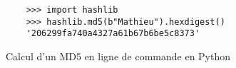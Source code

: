 \begin{figure}
  \begin{verbatim}
    >>> import hashlib
    >>> hashlib.md5(b"Mathieu").hexdigest()
    '206299fa740a4327a61b67b6be5c8373'
  \end{verbatim}

  \caption{Calcul d'un MD5 en ligne de commande en Python}
  \label{code:md5-hash-cli}
\end{figure}